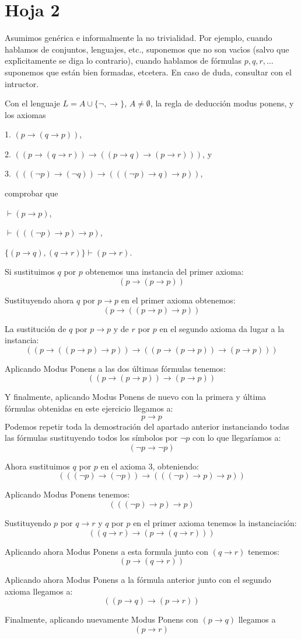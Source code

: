 \section{Hoja 2}

Asumimos gen\'erica e informalmente la no trivialidad. Por ejemplo,
cuando hablamos de conjuntos, lenguajes, etc., suponemos que no  son vac\'{\i}os (salvo que
expl\'{\i}citamente
se diga lo contrario),  cuando hablamos de f\'ormulas $p, q, r, \dots$
suponemos que est\'an bien formadas, etcetera.
En caso de duda, consultar con el intructor.

\begin{problem}[1]
Con el lenguaje $L = A \cup \{\neg, \to\}$, $A \ne \emptyset$, la regla de deducci\'on modus ponens,
y los axiomas

1.  $ (p\to (q\to p))$,

2. $( (p\to (q\to r)) \to  ( (p\to q) \to (p\to r)))$, y

3. $(( (\neg p) \to (\neg q)) \to  ( ((\neg p) \to q) \to p))$,

comprobar que

\ppart $\vdash (p\to p)$,

\ppart $\vdash ((( \neg p) \to p)\to p)$,

\ppart  $\{(p\to q), (q\to r)\} \vdash (p\to r)$.
\solution

\spart
Si sustituimos $q$ por $p$ obtenemos una instancia del primer axioma:
\[(p \to ( p \to p ))\]

Sustituyendo ahora $q$ por $p \to p$ en el primer axioma obtenemos:
\[(p \to (( p \to p) \to p))\]

La sustitución de $q$ por $p \to p$ y de $r$ por $p$ en el segundo axioma da lugar a la instancia:
\[((p \to (( p \to p ) \to p )) \to ((p \to (p \to p)) \to (p \to p)))\]

Aplicando Modus Ponens a las dos últimas fórmulas tenemos:
\[((p \to (p \to p)) \to (p \to p))\]

Y finalmente, aplicando Modus Ponens de nuevo con la primera y última fórmulas obtenidas en este ejercicio llegamos a:
\[p \to p\]
\spart
Podemos repetir toda la demostración del apartado anterior instanciando todas las fórmulas sustituyendo todos los símbolos por $\neg p$ con lo que llegaríamos a:
\[ (\neg p \to \neg p)\]

Ahora sustituimos $q$ por $p$ en el axioma 3, obteniendo:
\[ (( (\neg p) \to (\neg p)) \to  ( ((\neg p) \to p) \to p))\]

Aplicando Modus Ponens tenemos:
\[ ( ((\neg p) \to p) \to p)\]

\spart

Sustituyendo $p$ por $q \to r$ y $q$ por $p$ en el primer axioma tenemos la instanciación:
\[((q \to r) \to (p \to (q \to r)))\]

Aplicando ahora Modus Ponens a esta formula junto con $(q \to r)$ tenemos:
\[(p \to (q \to r))\]

Aplicando ahora Modus Ponens a la fórmula anterior junto con el segundo axioma llegamos a:
\[ ( (p\to q) \to (p\to r))\]

Finalmente, aplicando nuevamente Modus Ponens con $(p \to q)$ llegamos a
\[(p \to r )\]
\end{problem}

